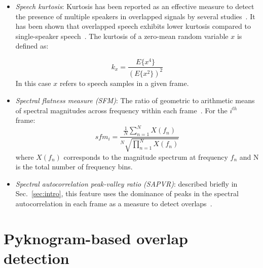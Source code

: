 \label{ssec:baseline}
\begin{itemize}
	\item {\it Speech kurtosis}: Kurtosis has been reported as an effective measure to detect the presence of multiple speakers in overlapped signals by several studies~\cite{Wrigley_05,boakye_thesis,temple_kurtosis}. 
	It has been shown that overlapped speech exhibits lower kurtosis compared to single-speaker speech~\cite{leblanc_deleon98}. The kurtosis of a zero-mean random variable $x$ is defined as:
	
	\begin{equation}
	\label{eq:kurtosis}
	k_x = \frac{E\{x^4\}}{(E\{x^2\})^2}
	\end{equation}
	\vspace{1mm}
	In this case $x$ refers to speech samples in a given frame. 
	\item {\it Spectral flatness measure (SFM)}: The ratio of geometric to arithmetic means of spectral magnitudes across frequency within each frame~\cite{nav_icassp13}. For the $i^{th}$ frame:
	\begin{equation}
	\label{eq:kurtosis}
	sfm_i = \frac{\frac{1}{N}\sum_{n=1}^{N}{X(f_n)}}{^N\sqrt{\prod_{n=1}^{N}{X(f_n)}}}
	\end{equation}
	\vspace{1mm}
	where $X(f_n)$ corresponds to the magnitude spectrum at frequency $f_n$ and {N} is the total number of frequency bins. 
	\item {\it Spectral autocorrelation peak-valley ratio (SAPVR)}: described briefly in Sec.~\ref{sec:intro}, this feature uses the dominance of peaks in the spectral autocorrelation in each frame as a measure to detect overlaps~\cite{sapvr_2000}. 
\end{itemize}


\section{Pyknogram-based overlap detection}
\label{sec:ovldet}

